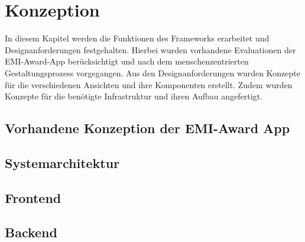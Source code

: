 \chapter{Konzeption}

In diesem Kapitel werden die Funktionen des Frameworks erarbeitet und
Designanforderungen festgehalten. Hierbei wurden vorhandene Evaluationen der
EMI-Award-App berücksichtigt und nach dem menschenzentrierten Gestaltungsprozess
vorgegangen. Aus den Designanforderungen wurden Konzepte für die verschiedenen
Ansichten und ihre Komponenten erstellt. Zudem wurden Konzepte für die benötigte
Infrastruktur und ihren Aufbau angefertigt.


\section{Vorhandene Konzeption der EMI-Award App}



\section{Systemarchitektur}


\section{Frontend}



\section{Backend}



